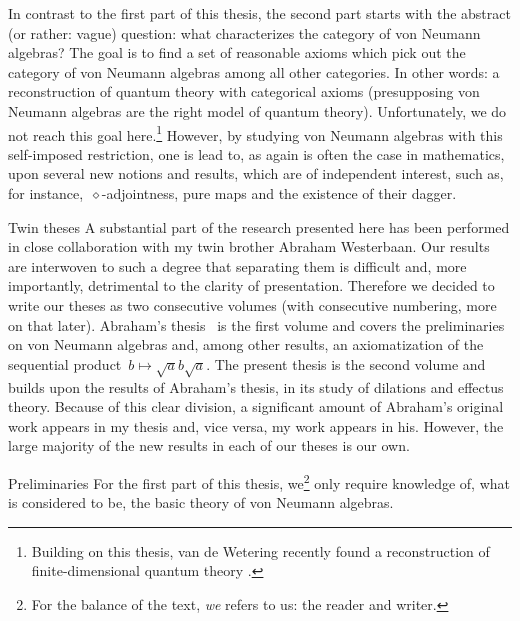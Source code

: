 \documentclass[b]{subfiles}
\begin{document}
\begin{parsec}
\begin{point}
\begin{point}
In contrast to the first part of this thesis,
    the second part starts
    with the abstract (or rather: vague) question:
    what characterizes the category of von Neumann algebras?
The goal is to find a set of reasonable axioms
    which pick out the category of von Neumann algebras
    among all other categories.
In other words: a reconstruction of quantum theory with categorical axioms
    (presupposing von Neumann algebras are the right model of quantum theory).
    Unfortunately, we do not reach this goal here.\footnote{%
        Building on this thesis,
            van de Wetering recently found a reconstruction
            of finite-dimensional quantum theory \cite{wetering}.}
However, by studying von Neumann algebras
    with this self-imposed restriction,
    one is lead to, as again is often the case in mathematics,
    upon several new notions and results,
    which are of independent interest,
    such as, for instance,~$\diamond$-adjointness,
    pure maps and the existence of their dagger.
\end{point}
\end{point}
\begin{point}{Twin theses}%
A substantial part of the research presented here
    has been performed in close collaboration with
    my twin brother Abraham Westerbaan.
Our results are interwoven to such a degree
    that separating them is difficult
    and, more importantly, detrimental to the clarity of presentation.
Therefore we decided to write our theses as two consecutive volumes
    (with consecutive numbering, more on that later).
    Abraham's thesis~\cite{bram} is the first volume
    and covers the preliminaries on von Neumann
    algebras and, among other results, an axiomatization of
        the sequential product~$b\mapsto \sqrt{a}b\sqrt{a}$.
The present thesis is the second volume and builds upon
    the results of Abraham's thesis,
            in its study of dilations and effectus theory.
Because of this clear division,
    a significant amount of Abraham's original work appears in my thesis
        and, vice versa, my work appears in his.
However, the large majority of the
        new results in each of our theses is our own.
\end{point}
\begin{point}{Preliminaries}%
For the first part of this thesis,
    we\footnote{%
        For the balance of the text,
        \emph{we} refers to us: the reader and writer.}
        only require knowledge of, what is considered to be,
    the basic theory of von Neumann algebras.

\end{point}
\end{parsec}
\end{document}
